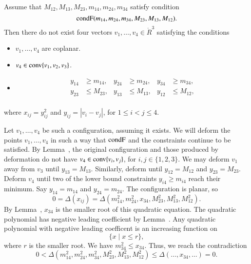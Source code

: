 \begin{tarskidata}
\begin{tarski}

\begin{lemma} 
Assume that $M_{12},M_{13},M_{23},m_{14},m_{24},m_{34}$ satisfy
condition 
$${\operatorname{condF}}(m_{14},m_{24},m_{34},M_{23},M_{13},M_{12}).$$
Then there do not exist four vectors
$v_1,\ldots,v_4\in\ring{R}^3$ satisfying the conditions
	\begin{itemize}
		\item $v_1,\ldots,v_4$ are coplanar.
		\item $v_4\in{\operatorname{conv}}\{v_1,v_2,v_3\}$.
		\item $$
	\begin{array}{rlrlrl}
		y_{14} &\ge m_{14}, &y_{24} &\ge m_{24}, &y_{34}&\ge m_{34},\\
		y_{23} &\le  M_{23}, &y_{13} & \le M_{13}, &y_{12}&\le M_{12},\\
	\end{array}
	$$
	\end{itemize}
where
$x_{ij}=y_{ij}^2$ and $y_{ij}=|v_i-v_j|$,
for $1\le i < j \le 4$.  
\end{lemma}



\begin{proved}
	Let $v_1,\ldots,v_4$ be such a configuration, assuming it exists.  
We will deform the points $v_1,\ldots,v_4$ in such a way that ${\operatorname{condF}}$ and
the constraints continue
to be satisfied.  By Lemma~,
the original configuration and those produced by deformation do not have
	$v_4\in{\operatorname{conv}}\{v_i,v_j\}$, for $i,j\in\{1,2,3\}$.
We may deform $v_1$ away from $v_3$ until $y_{13}=M_{13}$.  Similarly,
deform until $y_{12}=M_{12}$ and $y_{23}=M_{23}$.    Deform $v_4$ until two of the
lower bound constraints $y_{i4}\ge m_{i4}$ reach their minimum. 
Say $y_{14}=m_{14}$ and $y_{24}=m_{24}$.
The configuration is planar, so
	$$
	0=\Delta(x_{ij}) = \Delta(m_{14}^2,m_{24}^2,x_{34},M_{23}^2,M_{13}^2,M_{12}^2).
	$$
By Lemma~, $x_{34}$ is the smaller root of this quadratic equation.
The quadratic polynomial has negative leading coefficient by Lemma~.
Any quadratic polynomial with negative leading coefficent is an increasing function on
	$$\{x \mid x \le r\},$$ where $r$ is the smaller root.
We have $m_{34}^2\le x_{34}$. Thus, we reach the contradiction
	$$0<\Delta(m_{14}^2,m_{24}^2,m_{34}^2,M_{23}^2,M_{13}^2,M_{12}^2)
        \le \Delta(\ldots,x_{34},\ldots)= 0.$$
\swallowed\end{proved}
\end{tarski}








\end{tarskidata}
